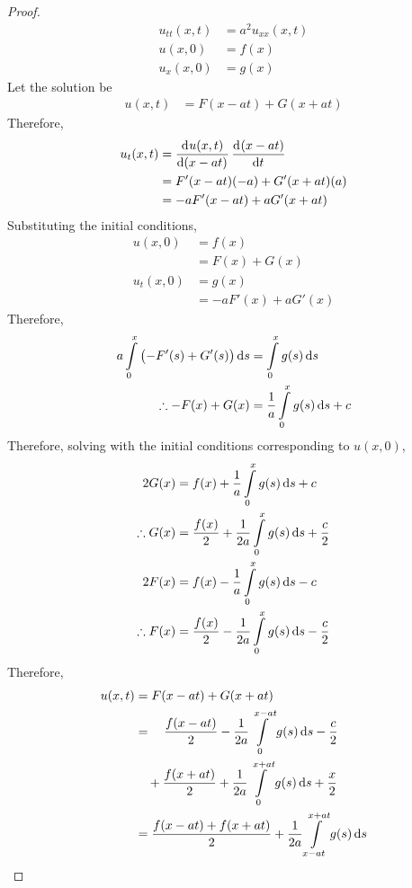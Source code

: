 \documentclass[titlepage, fleqn, a4paper, 12pt, twoside]{article}
\theoremstyle{definition}
\theoremstyle{theorem}
\begin{document}
\begin{proof}
\begin{align*}
	u_{t t}(x,t) & = a^2 u_{x x}(x,t) \\
	u(x,0)       & = f(x)             \\
	u_x(x,0)     & = g(x)
\end{align*}
Let the solution be
\begin{align*}
	u(x,t) & = F(x - a t) + G(x + a t)
\end{align*}
Therefore,
\begin{align*}
	u_t(x,t) & = \dod{u(x,t)}{(x - a t)} \dod{(x - a t)}{t} \\
                 & = F'(x - a t) (-a) + G'(x + a t) (a)         \\
                 & = -a F'(x - a t) + a G'(x + a t)
\end{align*}
Substituting the initial conditions,
\begin{align*}
	u(x,0)   & = f(x)        \\
                 & = F(x) + G(x) \\
	u_t(x,0) & = g(x)        \\
                 & = -a F'(x) + a G'(x)
\end{align*}
Therefore,
\begin{align*}
	a \int\limits_{0}^{x} \left( -F'(s) + G'(s) \right) \dif s & = \int\limits_{0}^{x} g(s) \dif s \\
	\therefore -F(x) + G(x)                                    & = \frac{1}{a} \int\limits_{0}^{x} g(s) \dif s + c
\end{align*}
Therefore, solving with the initial conditions corresponding to $u(x,0)$,
\begin{align*}
	2 G(x)          & = f(x) + \frac{1}{a} \int\limits_{0}^{x} g(s) \dif s + c                       \\
	\therefore G(x) & = \frac{f(x)}{2} + \frac{1}{2 a} \int\limits_{0}^{x} g(s) \dif s + \frac{c}{2} \\
	2 F(x)          & = f(x) - \frac{1}{a} \int\limits_{0}^{x} g(s) \dif s - c                       \\
	\therefore F(x) & = \frac{f(x)}{2} - \frac{1}{2 a} \int\limits_{0}^{x} g(s) \dif s - \frac{c}{2} \\
\end{align*}
Therefore,
\begin{align*}
	u(x,t) & = F(x - a t) + G(x + a t)                                                                        \\
               & = \quad \frac{f(x - a t)}{2} - \frac{1}{2 a} \int\limits_{0}^{x - a t} g(s) \dif s - \frac{c}{2} \\
               & \quad + \frac{f(x + a t)}{2} + \frac{1}{2 a} \int\limits_{0}^{x + a t} g(s) \dif s + \frac{x}{2} \\
               & = \frac{f(x - a t) + f(x + a t)}{2} + \frac{1}{2 a} \int\limits_{x - a t}^{x + a t} g(s) \dif s
\end{align*}
\end{proof}
\end{document}
